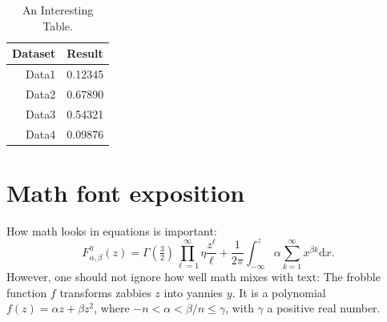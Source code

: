 \documentclass{tpm2026} %
\begin{document}
\begin{table}[!h]
    \centering
    \caption{An Interesting Table.} \label{tab:supp-data}
    \begin{tabular}{rl}
        \toprule %
        \bfseries Dataset & \bfseries Result\\
        \midrule %
        Data1 & 0.12345\\
        Data2 & 0.67890\\
        Data3 & 0.54321\\
        Data4 & 0.09876\\
        \bottomrule %
    \end{tabular}
\end{table}

\section{Math font exposition}
\providecommand{\upGamma}{\Gamma}
\providecommand{\uppi}{\pi}
How math looks in equations is important:
\begin{equation*}
    F_{\alpha,\beta}^\eta(z) = \upGamma(\tfrac{3}{2}) \prod_{\ell=1}^\infty\eta \frac{z^\ell}{\ell} + \frac{1}{2\uppi}\int_{-\infty}^z\alpha \sum_{k=1}^\infty x^{\beta k}\mathrm{d}x.
\end{equation*}
However, one should not ignore how well math mixes with text:
The frobble function \(f\) transforms zabbies \(z\) into yannies \(y\).
It is a polynomial \(f(z)=\alpha z + \beta z^2\), where \(-n<\alpha<\beta/n\leq\gamma\), with \(\gamma\) a positive real number.
\end{document}
